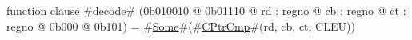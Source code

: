 function clause #\hyperref[zdecode]{decode}# (0b010010 @ 0b01110 @ rd : regno @ cb : regno @ ct : regno @ 0b000 @ 0b101) = #\hyperref[zSome]{Some}#(#\hyperref[zCPtrCmp]{CPtrCmp}#(rd, cb, ct, CLEU))
